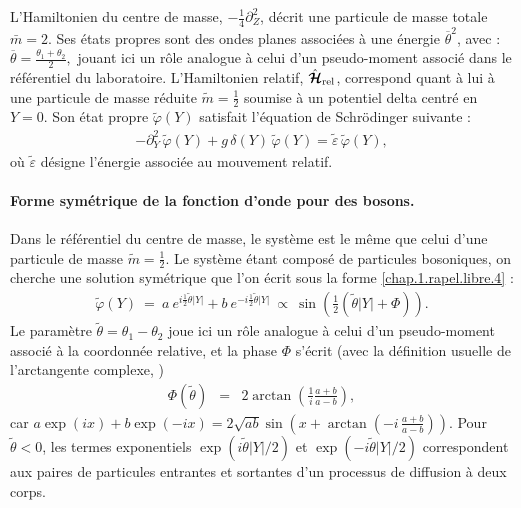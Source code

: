 L’Hamiltonien du centre de masse, \(-\frac{1}{4} \partial_Z^2\), décrit une particule de masse totale \(\bar{m} = 2\). Ses états propres sont des ondes planes associées à une énergie \(\overline{\theta}^2\), avec :
\(
\overline{\theta} = \frac{\theta_1 + \theta_2}{2},
\)
jouant ici un rôle analogue à celui d’un pseudo-moment associé dans le référentiel du laboratoire.
L'Hamiltonien relatif, \(\hat{\bm{\mathcal{H}}}_{\text{rel}}\), correspond quant à lui à une particule de masse réduite \(\tilde{m} = \frac{1}{2}\) soumise à un potentiel delta centré en \(Y = 0\). %
Son état propre \(\tilde{\varphi}(Y)\) satisfait l’équation de Schrödinger suivante :
\begin{eqnarray}\label{chap:1:hal.mod.2.part.5}
	- \partial_Y^2 \, \tilde{\varphi}(Y) + g \, \delta(Y) \, \tilde{\varphi}(Y) = \tilde{\varepsilon} \, \tilde{\varphi}(Y),
\end{eqnarray}
où \(\tilde{\varepsilon}\) désigne l’énergie associée au mouvement relatif.

\paragraph{Forme symétrique de la fonction d'onde pour des bosons.}
Dans le référentiel du centre de masse, le système est le même que celui d'une particule de masse $\tilde{m}= \frac{1}{2}$.
Le système étant composé de particules bosoniques, on cherche une solution symétrique que l’on écrit sous la forme \eqref{chap.1.rapel.libre.4} :
\begin{eqnarray}
	\tilde{\varphi}(Y) ~=~a~e^{i\frac{1}{2} \tilde{\theta} \vert Y \vert } + b~e^{-i\frac{1}{2} \tilde{\theta}\vert Y \vert } ~\propto~  \sin\left( \frac{1}{2} (\tilde{\theta} |Y| + \Phi ) \right). \label{eq:ansatz.boson}
\end{eqnarray}
Le paramètre \( \tilde{\theta} = \theta_1 - \theta_2 \) joue ici un rôle analogue à celui d’un pseudo-moment associé à la coordonnée relative,
et la phase \(\Phi\) s'écrit (avec la définition usuelle de l’arctangente complexe, ) 
\begin{eqnarray}
	\Phi(\tilde{\theta}) &=& 2 \arctan\left (\frac{1}{i} \frac{a+b}{a-b}\right),	\label{chap:1:dif.mod.2.part.1} 
\end{eqnarray}
car \( a\exp(ix)+b\exp(-ix) = 2\sqrt{ab}\sin\left(x+\arctan\left(-i\, \frac{a+b}{a-b}\right)\right) \). Pour $\tilde{\theta}<0$, les termes exponentiels \( \exp(i\tilde{\theta} \vert Y \vert/2 ) \) et \( \exp(-i\tilde{\theta} \vert Y \vert/2 ) \) correspondent aux paires de particules entrantes et sortantes d’un processus de diffusion à deux corps.

